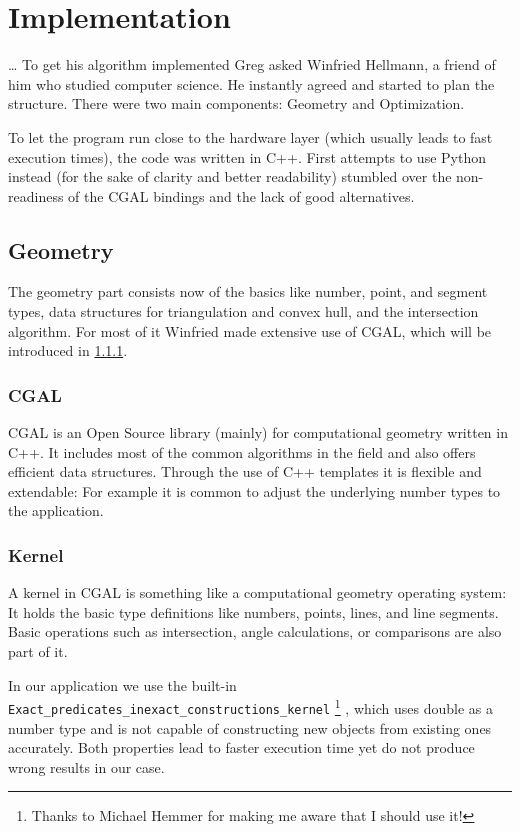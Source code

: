 \chapter{Implementation}\label{cha:implementation}
\ldots{}
To get his algorithm implemented Greg asked Winfried Hellmann, a
friend of him who studied computer science. He instantly agreed and
started to plan the structure. There were two main components:
Geometry and Optimization.

To let the program run close to the hardware layer (which usually
leads to fast execution times), the code was written in C++. First
attempts to use Python instead (for the sake of clarity and better
readability) stumbled over the non-readiness of the CGAL bindings and
the lack of good alternatives.

\section{Geometry}
The geometry part consists now of the basics like number, point, and
segment types, data structures for triangulation and convex hull, and
the intersection algorithm. For most of it Winfried made extensive use
of CGAL, which will be introduced in \cref{sec:CGAL}.

\subsection{CGAL}\label{sec:CGAL}
CGAL \cite{cgal} is an Open Source library (mainly) for computational
geometry written in C++. It includes most of the common algorithms in
the field and also offers efficient data structures. Through the use
of C++ templates it is flexible and extendable: For example it is
common to adjust the underlying number types to the application.

\subsection{Kernel}
A kernel in CGAL is something like a computational geometry operating
system: It holds the basic type definitions like numbers, points,
lines, and line segments. Basic operations such as intersection,
angle calculations, or comparisons are also part of it.

In our application we use the built-in 
\verb|Exact_predicates_inexact_constructions_kernel|%
\footnote{Thanks to Michael Hemmer for making me aware that I should
use it!} \cite{cgal_manual_epick}, which uses double as a number type
and is not capable of
constructing new objects from existing ones accurately. Both
properties lead to faster execution time yet do not produce wrong
results in our case.

